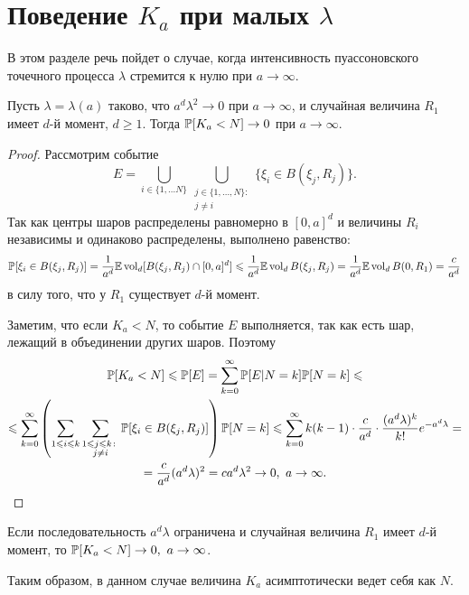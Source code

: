 \section{Поведение $K_a$ при малых $\lambda$}

В этом разделе речь пойдет о случае, когда интенсивность пуассоновского точечного процесса $\lambda$ стремится к нулю при $a\to\infty$.

\begin{thm}
Пусть $\lambda = \lambda(a)$ таково, что $a^d\lambda^2 \to 0$ при $a\to\infty$, и случайная величина $R_1$ имеет $d$-й момент, $d\geq 1$. Тогда $\mathbb{P}[K_a < N] \to 0$ при $a\to\infty$.
\end{thm}

\begin{proof}
Рассмотрим событие $$E =\bigcup_{i\in \{1, \ldots N\}} \bigcup_{\substack{j\in\{1, \ldots, N\}\colon\\ j \not= i}}\{\xi_i\in B(\xi_j, R_j)\}.$$
Так как центры шаров распределены равномерно в $[0, a]^d$ и величины $R_i$ независимы и одинаково распределены, выполнено равенство:
\begin{equation*}
    \mathbb{P}[\xi_i\in B(\xi_j, R_j)] =
    \dfrac{1}{a^d}\mathbb{E} \operatorname{vol}_d [B(\xi_j, R_j) \cap [0,a]^d] \leqslant
    \dfrac{1}{a^d}\mathbb{E} \operatorname{vol}_d B(\xi_j, R_j) = \dfrac{1}{a^d}\mathbb{E} \operatorname{vol}_d B(0, R_1) = \dfrac{c}{a^d}
\end{equation*}
в силу того, что у $R_1$ существует $d$-й момент.

Заметим, что если $K_a < N$, то событие $E$ выполняется, так как есть шар, лежащий в объединении других шаров. Поэтому 
\begin{multline*}
    \mathbb{P}[K_a < N]\leqslant
    \mathbb{P}[E] =
    \sum_{k=0}^\infty \mathbb{P}[E|N = k]\mathbb{P}[N = k] \leqslant\\
    \leqslant \sum_{k=0}^\infty \left(\sum_{1 \leqslant i \leqslant k}\sum_{\substack{1\leqslant j\leqslant k\colon\\ j\not= i}} \mathbb{P}[\xi_i\in B(\xi_j, R_j)] \right)\mathbb{P}[N = k] \leqslant 
    \sum_{k=0}^\infty k(k-1) \cdot\dfrac{c}{a^d}\cdot\dfrac{(a^d\lambda)^k}{k!}e^{-a^d\lambda} = \\
    = \dfrac{c}{a^d}(a^d\lambda)^2 = 
    ca^d\lambda^2 \to 0, \ a\to\infty.
\end{multline*}
\end{proof}

\begin{cor}
Если последовательность $a^d\lambda$ ограничена и случайная величина $R_1$ имеет $d$-й момент, то $\mathbb{P}[K_a < N] \to 0, \ a \to\infty$.
\end{cor}

Таким образом, в данном случае величина $K_a$ асимптотически ведет себя как $N$.
